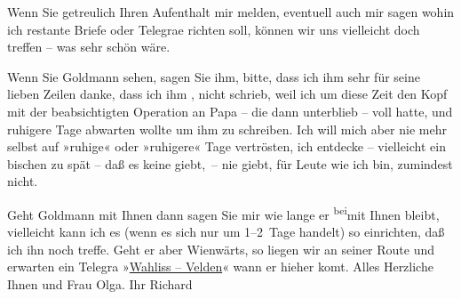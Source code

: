 \pstart
           {\pb}Wenn Sie getreulich Ihren
               Aufenthalt mir melden, eventuell auch mir sagen wohin ich restante Briefe oder
                  Telegra{\geminationm}e richten soll, können wir uns vielleicht doch treffen – was sehr schön wäre.\pend
           
\pstart
           {\pb}Wenn Sie Goldmann sehen, sagen Sie ihm, bitte, dass ich ihm sehr für
               seine lieben Zeilen danke, dass ich ihm \label{K_L01701-1v}\label{K_L01701-1}, nicht schrieb, weil ich um diese Zeit den Kopf mit der beabsichtigten
               Operation an Papa – die dann
               unterblieb – voll hatte, und ruhigere Tage abwarten wollte um ihm zu schreiben. Ich
               will mich aber nie mehr selbst auf »ruhige« oder »ruhigere« Tage vertrösten, ich {\pb}entdecke – vielleicht ein bischen
               zu spät – daß es keine giebt, – nie giebt, für Leute wie ich bin, zumindest
               nicht.\pend
           
\pstart
           Geht Goldmann mit Ihnen dann sagen Sie mir wie
               lange er \substVorne{}\textsuperscript{bei}\substDazwischen{}mit\substHinten{} Ihnen bleibt, vielleicht kann ich es (wenn {\pb}es sich nur um 1–2 Tage handelt) so
               einrichten, daß ich ihn noch treffe. Geht er aber Wienwärts, so liegen wir an seiner Route und erwarten ein Telegra{\geminationm} »\uline{Wahliss – Velden}« wann er hieher ko{\geminationm}mt. Alles Herzliche Ihnen und
               Frau Olga.\pend
           \pstart Ihr \spacefill\mbox{Richard}\pend{}\endnumbering{}  \newcommand{\dateiname}{L01701}\newcommand{\titel}{Richard Beer-Hofmann an Arthur Schnitzler, 23. 8. 1907}\newcommand{\editorInnen}{Martin Anton Müller und Gerd-Hermann Susen}
